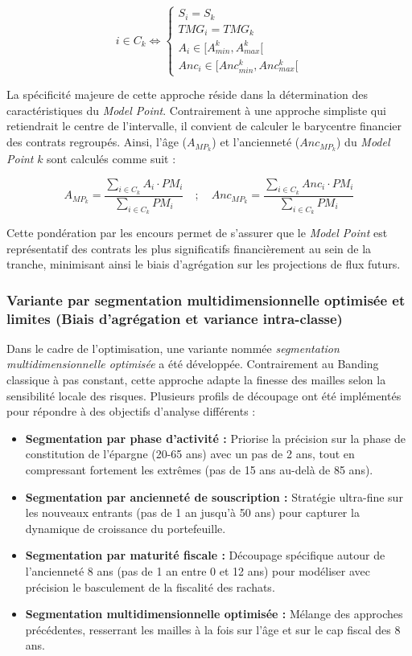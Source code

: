 \begin{equation}
i \in C_k \iff 
\begin{cases} 
S_i = S_k \\ 
TMG_i = TMG_k \\ 
A_i \in [A_{min}^k, A_{max}^k[ \\ 
Anc_i \in [Anc_{min}^k, Anc_{max}^k[ 
\end{cases}
\end{equation}

La spécificité majeure de cette approche réside dans la détermination des caractéristiques du \textit{Model Point}. Contrairement à une approche simpliste qui retiendrait le centre de l'intervalle, il convient de calculer le barycentre financier des contrats regroupés. Ainsi, l'âge ($A_{MP_k}$) et l'ancienneté ($Anc_{MP_k}$) du \textit{Model Point} $k$ sont calculés comme suit :

\begin{equation}
A_{MP_k} = \frac{\sum_{i \in C_k} A_i \cdot PM_i}{\sum_{i \in C_k} PM_i} \quad ; \quad Anc_{MP_k} = \frac{\sum_{i \in C_k} Anc_i \cdot PM_i}{\sum_{i \in C_k} PM_i}
\end{equation}

Cette pondération par les encours permet de s'assurer que le \textit{Model Point} est représentatif des contrats les plus significatifs financièrement au sein de la tranche, minimisant ainsi le biais d'agrégation sur les projections de flux futurs.

\subsubsection{Variante par segmentation multidimensionnelle optimisée et limites (Biais d'agrégation et variance intra-classe)}
Dans le cadre de l'optimisation, une variante nommée \textit{segmentation multidimensionnelle optimisée} a été développée. Contrairement au Banding classique à pas constant, cette approche adapte la finesse des mailles selon la sensibilité locale des risques. Plusieurs profils de découpage ont été implémentés pour répondre à des objectifs d'analyse différents :
\begin{itemize}
    \item \textbf{Segmentation par phase d'activité :} Priorise la précision sur la phase de constitution de l'épargne (20-65 ans) avec un pas de 2 ans, tout en compressant fortement les extrêmes (pas de 15 ans au-delà de 85 ans).
    \item \textbf{Segmentation par ancienneté de souscription :} Stratégie ultra-fine sur les nouveaux entrants (pas de 1 an jusqu'à 50 ans) pour capturer la dynamique de croissance du portefeuille.       
    \item \textbf{Segmentation par maturité fiscale :} Découpage spécifique autour de l'ancienneté 8 ans (pas de 1 an entre 0 et 12 ans) pour modéliser avec précision le basculement de la fiscalité des rachats.
    \item \textbf{Segmentation multidimensionnelle optimisée :} Mélange des approches précédentes, resserrant les mailles à la fois sur l'âge et sur le cap fiscal des 8 ans.
\end{itemize}
